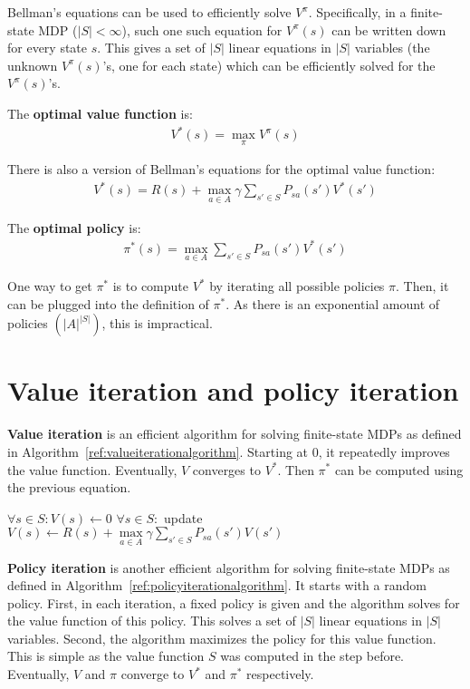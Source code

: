 \documentclass{report}
\begin{document}
Bellman's equations can be used to efficiently solve $V^{\pi}$. Specifically, in a finite-state MDP ($\vert S\vert < \infty$), such one such equation for $V^{\pi}(s)$ can be written down for every state $s$. This gives a set of $\vert S\vert$ linear equations in $\vert S\vert$ variables (the unknown $V^{\pi}(s)$'s, one for each state) which can be efficiently solved for the $V^{\pi}(s)$'s.

The {\bf optimal value function} is:
\begin{align*}
V^{*}(s) = \max\limits_{\pi} V^{\pi}(s)
\end{align*}

There is also a version of Bellman's equations for the optimal value function:
\begin{align*}
V^{*}(s) = R(s)+\max\limits_{a\in A} \gamma \sum_{s'\in S} P_{sa}(s')V^{*}(s')
\end{align*}

The {\bf optimal policy} is:
\begin{align*}
\pi^{*}(s) = \max\limits_{a\in A} \sum_{s'\in S} P_{sa}(s')V^{*}(s')
\end{align*}

One way to get $\pi^{*}$ is to compute $V^{*}$ by iterating all possible policies $\pi$. Then, it can be plugged into the definition of $\pi^{*}$. As there is an exponential amount of policies $(\vert A\vert^{\vert S \vert})$, this is impractical.

\section{Value iteration and policy iteration}
{\bf Value iteration} is an efficient algorithm for solving finite-state MDPs as defined in Algorithm~\ref{ref:valueiterationalgorithm}. Starting at 0, it repeatedly improves the value function. Eventually, $V$ converges to $V^{*}$. Then $\pi^{*}$ can be computed using the previous equation.

\begin{algorithm}[h!]
\caption{Value iteration}
\label{ref:valueiterationalgorithm}
\begin{algorithmic}
\State $\forall s\in S: V(s) \gets 0$
\Repeat
\State $\forall s\in S:$ update $V(s) \gets R(s) + \max\limits_{a\in A} \gamma \sum_{s'\in S} P_{sa}(s')V(s')$
\end{algorithmic}
\end{algorithm}

{\bf Policy iteration} is another efficient algorithm for solving finite-state MDPs as defined in Algorithm~\ref{ref:policyiterationalgorithm}. It starts with a random policy. First, in each iteration, a fixed policy is given and the algorithm solves for the value function of this policy. This solves a set of $\vert S\vert$ linear equations in $\vert S\vert$ variables. Second, the algorithm maximizes the policy for this value function. This is simple as the value function $S$ was computed in the step before. Eventually, $V$ and $\pi$ converge to $V^{*}$ and $\pi^{*}$ respectively.
\end{document}
